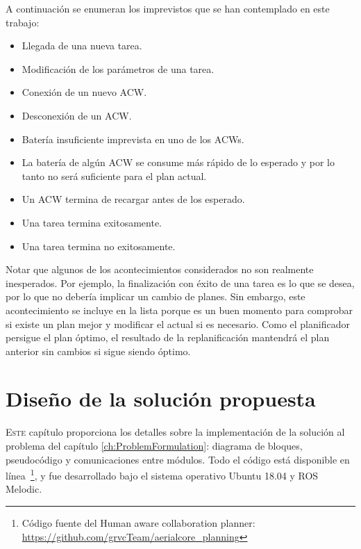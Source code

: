 \documentclass[fontsize=11pt, English=false, Español=true, Myfinal=true, twoside, numbers=noenddot]{scrbook}
\begin{document}
{A continuación se enumeran los imprevistos que se han contemplado en este trabajo:

\begin{itemize}
    \item Llegada de una nueva tarea.
    \item Modificación de los parámetros de una tarea.
    \item Conexión de un nuevo \gls{ACW}.
    \item Desconexión de un \gls{ACW}.
    \item Batería insuficiente imprevista en uno de los \glspl{ACW}.
    \item La batería de algún \gls{ACW} se consume más rápido de lo esperado y por lo tanto no será suficiente para el plan actual.
    \item Un \gls{ACW} termina de recargar antes de los esperado.
    \item Una tarea termina exitosamente.
    \item Una tarea termina no exitosamente.
\end{itemize}

Notar que algunos de los acontecimientos considerados no son realmente inesperados. Por ejemplo, la finalización con éxito de una tarea es lo que se desea, por lo que no debería implicar un cambio de planes. Sin embargo, este acontecimiento se incluye en la lista porque es un buen momento para comprobar si existe un plan mejor y modificar el actual si es necesario. Como el planificador persigue el plan óptimo, el resultado de la replanificación mantendrá el plan anterior sin cambios si sigue siendo óptimo.
%
%
\chapter{Diseño de la solución propuesta}
\label{ch:DesignOfTheProposedSolution}
\lettrine[lraise=-0.1, lines=2, loversize=0.2]{E}{ste} capítulo proporciona los detalles sobre la implementación de la solución al problema del capítulo \ref{ch:ProblemFormulation}: diagrama de bloques, pseudocódigo y comunicaciones entre módulos. Todo el código está disponible en línea~\footnote{Código fuente del Human aware collaboration planner: \url{https://github.com/grvcTeam/aerialcore_planning}}, y fue desarrollado bajo el sistema operativo Ubuntu 18.04 y ROS Melodic.

}
\end{document}
